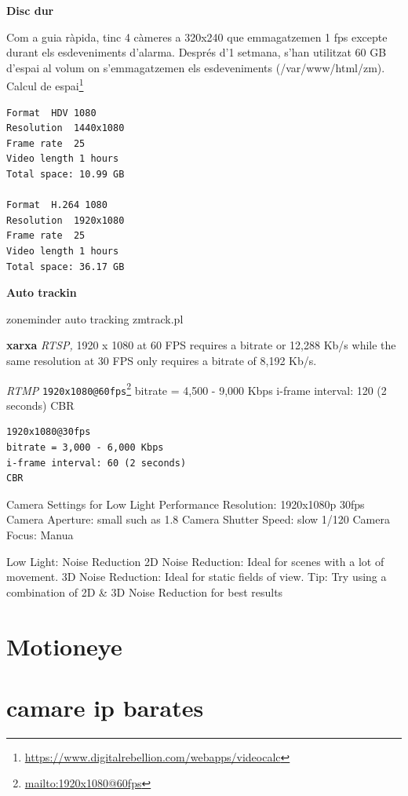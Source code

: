 \documentclass[
  10pt,
]{krantz}
\DeclareRobustCommand{\href}[2]{#2\footnote{\url{#1}}}
\begin{document}
\textbf{Disc dur}

Com a guia ràpida, tinc 4 càmeres a 320x240 que emmagatzemen 1 fps excepte durant els esdeveniments d'alarma. Després d'1 setmana, s'han utilitzat 60 GB d'espai al volum on s'emmagatzemen els esdeveniments (/var/www/html/zm). \href{https://www.digitalrebellion.com/webapps/videocalc}{Calcul de espai}

\begin{verbatim}
Format  HDV 1080
Resolution  1440x1080
Frame rate  25
Video length 1 hours
Total space: 10.99 GB

Format  H.264 1080
Resolution  1920x1080
Frame rate  25
Video length 1 hours
Total space: 36.17 GB
\end{verbatim}

\textbf{Auto trackin}

zoneminder auto tracking zmtrack.pl

\textbf{xarxa} \emph{RTSP,} 1920 x 1080 at 60 FPS requires a bitrate or 12,288 Kb/s while the same resolution at 30 FPS only requires a bitrate of 8,192 Kb/s.

\emph{RTMP} \href{mailto:1920x1080@60fps}{\nolinkurl{1920x1080@60fps}} bitrate = 4,500 - 9,000 Kbps i-frame interval: 120 (2 seconds) CBR

\begin{verbatim}
1920x1080@30fps
bitrate = 3,000 - 6,000 Kbps
i-frame interval: 60 (2 seconds)
CBR
\end{verbatim}

Camera Settings for Low Light Performance Resolution: 1920x1080p 30fps Camera Aperture: small such as 1.8 Camera Shutter Speed: slow 1/120 Camera Focus: Manua

Low Light: Noise Reduction 2D Noise Reduction: Ideal for scenes with a lot of movement. 3D Noise Reduction: Ideal for static fields of view. Tip: Try using a combination of 2D \& 3D Noise Reduction for best results

\hypertarget{motioneye}{%
\section{Motioneye}\label{motioneye}}

\hypertarget{camare-ip-barates}{%
\section{camare ip barates}\label{camare-ip-barates}}
\end{document}

